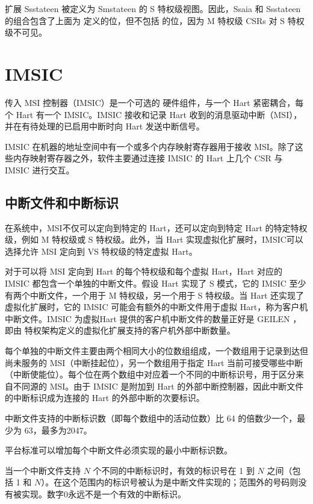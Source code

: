 \begin{translation}
扩展 Ssstateen 被定义为 Smstateen 的 S 特权级视图。因此，Ssaia 和 Ssstateen 的组合包含了上面为  定义的位，但不包括  的位，因为 M 特权级 CSRs 对 S 特权级不可见。

\section{IMSIC}

传入 MSI 控制器（IMSIC）是一个可选的 {\RISCV} 硬件组件，与一个 Hart 紧密耦合，每个 Hart 有一个 IMSIC。IMSIC 接收和记录 Hart 收到的消息驱动中断（MSI），并在有待处理的已启用中断时向 Hart 发送中断信号。

IMSIC 在机器的地址空间中有一个或多个内存映射寄存器用于接收 MSI。除了这些内存映射寄存器之外，软件主要通过连接 IMSIC 的 Hart 上几个 {\RISCV} CSR 与 IMSIC 进行交互。

\subsection{中断文件和中断标识}

在{\RISCV}系统中，MSI不仅可以定向到特定的 Hart，还可以定向到特定 Hart 的特定特权级，例如 M 特权级或 S 特权级。此外，当 Hart 实现虚拟化扩展时，IMSIC可以选择允许 MSI 定向到 VS 特权级的特定虚拟 Hart。

对于可以将 MSI 定向到 Hart 的每个特权级和每个虚拟 Hart，Hart 对应的 IMSIC 都包含一个单独的中断文件。假设 Hart 实现了 S 模式，它的 IMSIC 至少有两个中断文件，一个用于 M 特权级，另一个用于 S 特权级。当 Hart 还实现了虚拟化扩展时，它的 IMSIC 可能会有额外的中断文件用于虚拟 Hart，称为客户机中断文件。IMSIC 为虚拟Hart 提供的客户机中断文件的数量正好是 GEILEN ，即由 {\RISCV} 特权架构定义的虚拟化扩展支持的客户机外部中断数量。

每个单独的中断文件主要由两个相同大小的位数组组成，一个数组用于记录到达但尚未服务的 MSI（中断挂起位），另一个数组用于指定 Hart 当前可接受哪些中断（中断使能位）。每个位在两个数组中对应着一个不同的中断标识号，用于区分来自不同源的 MSI。由于 IMSIC 是附加到 Hart 的外部中断控制器，因此中断文件的中断标识成为连接的 Hart 的外部中断的次要标识。

中断文件支持的中断标识数（即每个数组中的活动位数）比 64 的倍数少一个，最少为 63，最多为2047。

\begin{commentary}
    平台标准可以增加每个中断文件必须实现的最小中断标识数。
\end{commentary}

当一个中断文件支持 $N$ 个不同的中断标识时，有效的标识号在 1 到 $N$ 之间（包括 1 和 $N$）。在这个范围内的标识号被认为是中断文件实现的；范围外的号码则没有被实现。数字0永远不是一个有效的中断标识。


\end{translation}

